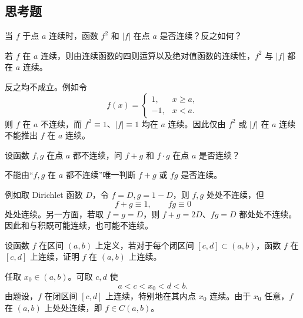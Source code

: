 \subsection{思考题}

\begin{xthought}[1]
当 $f$ 于点 $a$ 连续时，函数 $f^2$ 和 $|f|$ 在点 $a$ 是否连续？反之如何？
\end{xthought}
\begin{xsolution}
若 $f$ 在 $a$ 连续，则由连续函数的四则运算以及绝对值函数的连续性，$f^2$ 与 $|f|$ 都在 $a$ 连续。

反之均不成立。例如令
\[
 f(x)=\begin{cases}
  1,&x\ge a,\\
  -1,&x<a.
 \end{cases}
\]
则 $f$ 在 $a$ 不连续，而 $f^2\equiv1$、$|f|\equiv1$ 均在 $a$ 连续。因此仅由 $f^2$ 或 $|f|$ 在 $a$ 连续不能推出 $f$ 在 $a$ 连续。
\end{xsolution}


\begin{xthought}[2]
设函数 $f,g$ 在点 $a$ 都不连续，问 $f+g$ 和 $f\cdot g$ 在点 $a$ 是否连续？
\end{xthought}
\begin{xsolution}
不能由“$f,g$ 在 $a$ 都不连续”唯一判断 $f+g$ 或 $fg$ 是否连续。

例如取 Dirichlet 函数 $D$，令 $f=D,g=1-D$，则 $f,g$ 处处不连续，但
\[
 f+g\equiv1,\qquad fg\equiv0
\]
处处连续。另一方面，若取 $f=g=D$，则 $f+g=2D$、$fg=D$ 都处处不连续。因此和与积既可能连续，也可能不连续。
\end{xsolution}


\begin{xthought}[3]
设函数 $f$ 在区间 $(a,b)$ 上定义，若对于每个闭区间 $[c,d]\subset(a,b)$，函数 $f$ 在 $[c,d]$ 上连续，证明 $f$ 在 $(a,b)$ 上连续。
\end{xthought}
\begin{xsolution}
任取 $x_0\in(a,b)$。可取 $c,d$ 使
\[
 a<c<x_0<d<b.
\]
由题设，$f$ 在闭区间 $[c,d]$ 上连续，特别地在其内点 $x_0$ 连续。由于 $x_0$ 任意，$f$ 在 $(a,b)$ 上处处连续，即 $f\in C(a,b)$。
\end{xsolution}


